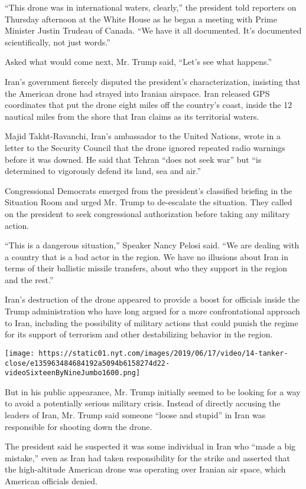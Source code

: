 ``This drone was in international waters, clearly,'' the president told
reporters on Thursday afternoon at the White House as he began a meeting
with Prime Minister Justin Trudeau of Canada. ``We have it all
documented. It's documented scientifically, not just words.''

Asked what would come next, Mr. Trump said, ``Let's see what happens.''

Iran's government fiercely disputed the president's characterization,
insisting that the American drone had strayed into Iranian airspace.
Iran released GPS coordinates that put the drone eight miles off the
country's coast, inside the 12 nautical miles from the shore that Iran
claims as its territorial waters.

Majid Takht-Ravanchi, Iran's ambassador to the United Nations, wrote in
a letter to the Security Council that the drone ignored repeated radio
warnings before it was downed. He said that Tehran ``does not seek war''
but ``is determined to vigorously defend its land, sea and air.''

Congressional Democrats emerged from the president's classified briefing
in the Situation Room and urged Mr. Trump to de-escalate the situation.
They called on the president to seek congressional authorization before
taking any military action.

``This is a dangerous situation,'' Speaker Nancy Pelosi said. ``We are
dealing with a country that is a bad actor in the region. We have no
illusions about Iran in terms of their ballistic missile transfers,
about who they support in the region and the rest.''

Iran's destruction of the drone appeared to provide a boost for
officials inside the Trump administration who have long argued for a
more confrontational approach to Iran, including the possibility of
military actions that could punish the regime for its support of
terrorism and other destabilizing behavior in the region.

\texttt{[image: https://static01.nyt.com/images/2019/06/17/video/14-tanker-close/e135963484684192a5094b6158274d22-videoSixteenByNineJumbo1600.png]}

But in his public appearance, Mr. Trump initially seemed to be looking
for a way to avoid a potentially serious military crisis. Instead of
directly accusing the leaders of Iran, Mr. Trump said someone ``loose
and stupid'' in Iran was responsible for shooting down the drone.

The president said he suspected it was some individual in Iran who
``made a big mistake,'' even as Iran had taken responsibility for the
strike and asserted that the high-altitude American drone was operating
over Iranian air space, which American officials denied.

